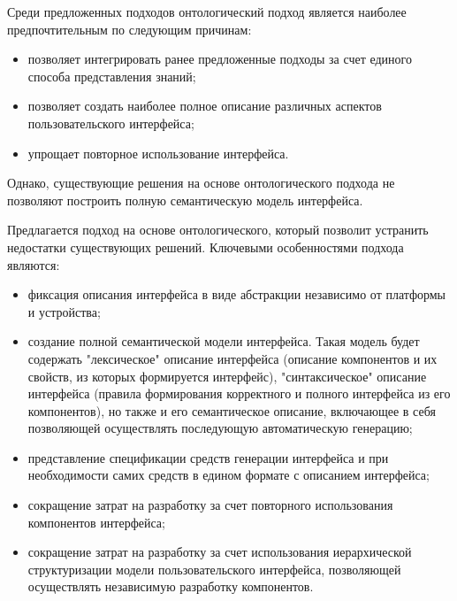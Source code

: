 \begin{SCn}
Среди предложенных подходов онтологический подход является наиболее предпочтительным по следующим причинам:
\begin{itemize}
	\item позволяет интегрировать ранее предложенные подходы за счет единого способа представления знаний; 
	\item позволяет создать наиболее полное описание различных аспектов пользовательского интерфейса;
	\item упрощает повторное использование интерфейса.
\end{itemize}
Однако, существующие решения на основе онтологического подхода не позволяют построить полную семантическую модель интерфейса.

Предлагается подход на основе онтологического, который позволит устранить недостатки существующих решений. Ключевыми особенностями подхода являются:
\begin{itemize}
	\item фиксация описания интерфейса в виде абстракции независимо от платформы и устройства;
	\item создание полной семантической модели интерфейса. Такая модель будет содержать "лексическое" описание интерфейса (описание компонентов и их свойств, из которых формируется интерфейс), "синтаксическое" описание интерфейса (правила формирования корректного и полного интерфейса из его компонентов), но также и его семантическое описание, включающее в себя позволяющей осуществлять последующую автоматическую генерацию;
	\item представление спецификации средств генерации интерфейса и при необходимости самих средств в едином формате с описанием интерфейса;
	\item сокращение затрат на разработку за счет повторного использования компонентов интерфейса;
	\item сокращение затрат на разработку за счет использования иерархической структуризации модели пользовательского интерфейса, позволяющей осуществлять независимую разработку компонентов.
\end{itemize}


\end{SCn}
